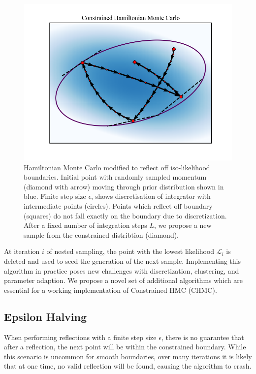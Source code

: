 \documentclass[11pt]{article}
\begin{document}
    \begin{figure}[t!]
        \center
        \includegraphics[width=\linewidth]{../figures/ConstrainedHMC}
        \caption{
        Hamiltonian Monte Carlo modified to reflect off iso-likelihood boundaries. Initial point with randomly sampled
        momentum (diamond with arrow) moving through prior distribution shown in blue. Finite step size $\epsilon$,
        shows discretisation of integrator with intermediate points (circles). Points which reflect off
        boundary (squares) do not fall exactly on the boundary due to discretization. After a fixed number of
        integration steps $L$, we propose a new sample from the constrained distribtion (diamond).
        }\label{fig:constrainedhmc}
    \end{figure}

    At iteration $i$ of nested sampling, the point with the lowest likelihood $\mathcal{L}_i$ is deleted and used to
    seed the generation of the next sample.
    Implementing this algorithm in practice poses new challenges with discretization, clustering, and parameter adaption.
    We propose a novel set of additional algorithms which are essential for a working implementation of
    Constrained HMC (CHMC).

    \subsection{Epsilon Halving}
    When performing reflections with a finite step size $\epsilon$, there is no guarantee that after a reflection,
    the next point will be within the constrained boundary.
    While this scenario is uncommon for smooth boundaries, over many iterations it is likely that at one time,
    no valid reflection will be found, causing the algorithm to crash.
\end{document}
